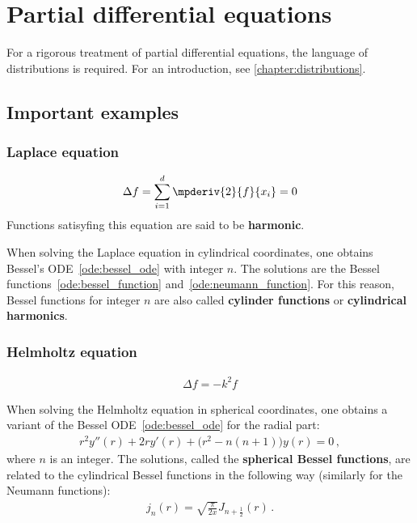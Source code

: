 \chapter{Partial differential equations}\label{chapter:pde}

    For a rigorous treatment of partial differential equations, the language of distributions is required. For an introduction, see \cref{chapter:distributions}.

    \minitoc

\section{Important examples}
\subsection{Laplace equation}

    \begin{example}\label{pde:laplace_equation}
        \begin{gather}
            \Delta f = \sum_{i=1}^d\mpderiv{2}{f}{x_i}=0
        \end{gather}
        Functions satisyfing this equation are said to be \textbf{harmonic}.
    \end{example}

    When solving the Laplace equation in cylindrical coordinates, one obtains Bessel's ODE~\eqref{ode:bessel_ode} with integer $n$. The solutions are the Bessel functions~\eqref{ode:bessel_function} and~\eqref{ode:neumann_function}. For this reason, Bessel functions for integer $n$ are also called \textbf{cylinder functions} or \textbf{cylindrical harmonics}.

\subsection{Helmholtz equation}

    \begin{example}\label{pde:helmholtz_equation}
        \begin{gather}
            \Delta f = -k^2f
        \end{gather}
    \end{example}

    When solving the Helmholtz equation in spherical coordinates, one obtains a variant of the Bessel ODE~\eqref{ode:bessel_ode} for the radial part:
    \begin{gather}
        r^2y''(r) + 2ry'(r) + \bigl(r^2 - n(n+1)\bigr)y(r) = 0\,,
    \end{gather}
    where $n$ is an integer. The solutions, called the \textbf{spherical Bessel functions}, are related to the cylindrical Bessel functions in the following way (similarly for the Neumann functions):
    \begin{gather}
        j_n(r) = \sqrt{\frac{\pi}{2x}}J_{n + \frac{1}{2}}(r)\,.
    \end{gather}

